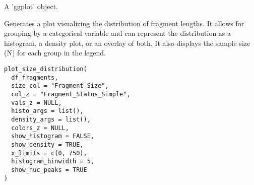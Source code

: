 \documentclass[a4paper]{book}
\begin{document}
%
\begin{Value}
A 'ggplot' object.
\end{Value}
%
\begin{Description}
Generates a plot visualizing the distribution of fragment lengths. It allows for grouping by a
categorical variable and can represent the distribution as a histogram, a density plot, or an overlay of both.
It also displays the sample size (N) for each group in the legend.
\end{Description}
%
\begin{Usage}
\begin{verbatim}
plot_size_distribution(
  df_fragments,
  size_col = "Fragment_Size",
  col_z = "Fragment_Status_Simple",
  vals_z = NULL,
  histo_args = list(),
  density_args = list(),
  colors_z = NULL,
  show_histogram = FALSE,
  show_density = TRUE,
  x_limits = c(0, 750),
  histogram_binwidth = 5,
  show_nuc_peaks = TRUE
)
\end{verbatim}
\end{Usage}
%
\end{document}
